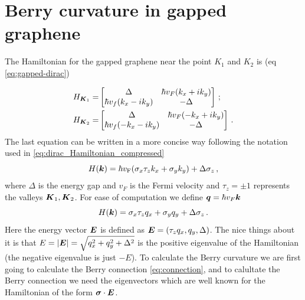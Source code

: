 \section{Berry curvature in gapped graphene}

The Hamiltonian for the gapped graphene near the point $K_1$ and $K_2$ is (eq \ref{eq:gapped-dirac})

\begin{equation}
\begin{split}
    H_{\boldsymbol{K}_1}=&
    \begin{bmatrix}
        \Delta & \hbar v_F(k_x+ik_y)\\
        \hbar v_f(k_x-ik_y)& -\Delta
    \end{bmatrix}\,;\\
    H_{\boldsymbol{K}_2}=&
    \begin{bmatrix}
        \Delta & \hbar v_F(-k_x+ik_y)\\
        \hbar v_f(-k_x-ik_y)& -\Delta
    \end{bmatrix}\,.
\end{split}
\end{equation}
The last equation can be written in a more concise way following the notation used in \ref{eq:dirac_Hamiltonian_compressed}
\begin{equation}
    H(\boldsymbol{k})=\hbar v_\textrm{F}(\sigma_x\tau_zk_x+\sigma_yk_y) + \Delta \sigma_z\,,
\end{equation}
where $\Delta$ is the energy gap and $v_F$ is the Fermi velocity and $\tau_z=\pm 1$ represents the valleys $\boldsymbol{K}_1,\boldsymbol{K}_2$. For ease of computation we define $\boldsymbol{q}=\hbar v_F\boldsymbol{k}$
\begin{equation}
    H(\boldsymbol{k})= \sigma_x\tau_z q_x+\sigma_y q_y + \Delta \sigma_z\,.
\end{equation}
Here the energy vector $\boldsymbol{E}$ is defined as $\boldsymbol{E} =(\tau_z q_x,q_y,\Delta)$. The nice things about it is that $E=|\boldsymbol{E}|=\sqrt{q_x^2+q_y^2+\Delta^2}$ is the positive eigenvalue of the Hamiltonian (the negative eigenvalue is just $-E$).\newline
To calculate the Berry curvature we are first going to calculate the Berry connection \ref{eq:connection}, and to calultate the Berry connection we need the eigenvectors which are well known for the Hamiltonian of the form $\boldsymbol \sigma \cdot \boldsymbol{E}$.

